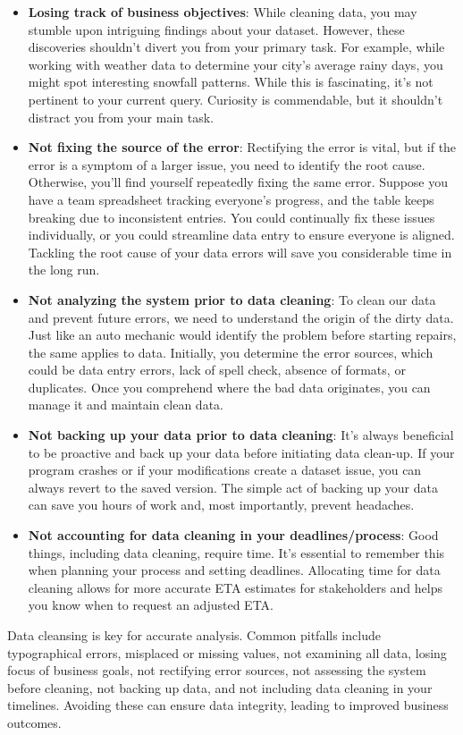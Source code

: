 \documentclass[]{article}
\begin{document}
\begin{itemize}
  \item \textbf{Losing track of business objectives}: While cleaning data, you may stumble upon intriguing findings about your dataset. However, these discoveries shouldn’t divert you from your primary task. For example, while working with weather data to determine your city’s average rainy days, you might spot interesting snowfall patterns. While this is fascinating, it’s not pertinent to your current query. Curiosity is commendable, but it shouldn’t distract you from your main task.
  \item \textbf{Not fixing the source of the error}: Rectifying the error is vital, but if the error is a symptom of a larger issue, you need to identify the root cause. Otherwise, you’ll find yourself repeatedly fixing the same error. Suppose you have a team spreadsheet tracking everyone’s progress, and the table keeps breaking due to inconsistent entries. You could continually fix these issues individually, or you could streamline data entry to ensure everyone is aligned. Tackling the root cause of your data errors will save you considerable time in the long run.
  \item \textbf{Not analyzing the system prior to data cleaning}: To clean our data and prevent future errors, we need to understand the origin of the dirty data. Just like an auto mechanic would identify the problem before starting repairs, the same applies to data. Initially, you determine the error sources, which could be data entry errors, lack of spell check, absence of formats, or duplicates. Once you comprehend where the bad data originates, you can manage it and maintain clean data.
  \item \textbf{Not backing up your data prior to data cleaning}: It’s always beneficial to be proactive and back up your data before initiating data clean-up. If your program crashes or if your modifications create a dataset issue, you can always revert to the saved version. The simple act of backing up your data can save you hours of work and, most importantly, prevent headaches.
  \item \textbf{Not accounting for data cleaning in your deadlines/process}: Good things, including data cleaning, require time. It’s essential to remember this when planning your process and setting deadlines. Allocating time for data cleaning allows for more accurate ETA estimates for stakeholders and helps you know when to request an adjusted ETA.
\end{itemize}

Data cleansing is key for accurate analysis. Common pitfalls include typographical errors, misplaced or missing values, not examining all data, losing focus of business goals, not rectifying error sources, not assessing the system before cleaning, not backing up data, and not including data cleaning in your timelines. Avoiding these can ensure data integrity, leading to improved business outcomes.
\end{document}
